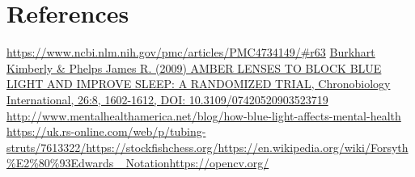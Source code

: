 \documentclass[onecolumn]{IEEEtran}
\begin{document}
\section{References}
\noindent [1] \href{https://www.ncbi.nlm.nih.gov/pmc/articles/PMC4734149/\#r63}{https://www.ncbi.nlm.nih.gov/pmc/articles/PMC4734149/\#r63} \newline
[2] \href{https://www.tandfonline.com/doi/abs/10.3109/07420520903523719?casa_token=xuj5yeT4EWEAAAAA\%3ADS5C1NhfiI1XBogq05OfmNmXPNALfdGdCkl8oOSUKUsNgLJZQW5dzziJ_a5yXX3H1YCVc57m8jc\&}{Burkhart Kimberly \& Phelps James R. (2009) AMBER LENSES TO BLOCK BLUE LIGHT AND IMPROVE SLEEP: A RANDOMIZED TRIAL, Chronobiology International, 26:8, 1602-1612, DOI: 10.3109/07420520903523719} \newline
[3] \href{http://www.mentalhealthamerica.net/blog/how-blue-light-affects-mental-health}{http://www.mentalhealthamerica.net/blog/how-blue-light-affects-mental-health} \newline
[4]\href{https://uk.rs-online.com/web/p/tubing-struts/7613322/}{https://uk.rs-online.com/web/p/tubing-struts/7613322/}\newline
[5]\href{https://stockfishchess.org/}{https://stockfishchess.org/}\newline
[6]\href{https://en.wikipedia.org/wiki/Forsyth\%E2\%80\%93Edwards\_ Notation}
{https://en.wikipedia.org/wiki/Forsyth\%E2\%80\%93Edwards\_ Notation}\newline
[7]\href{https://opencv.org/}{https://opencv.org/}
\end{document}
